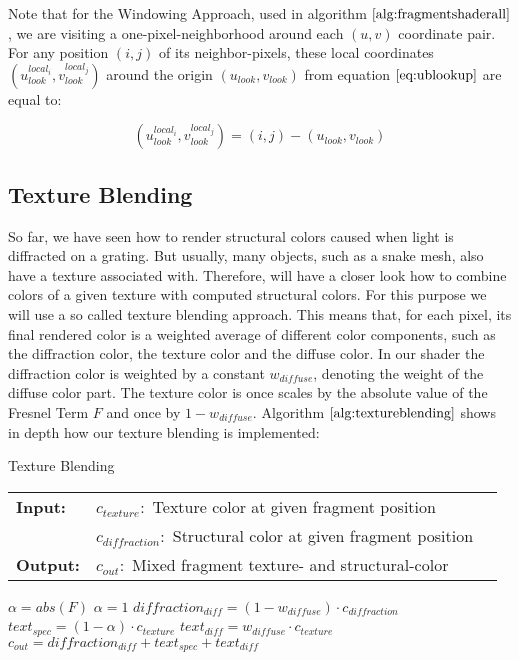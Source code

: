 Note that for the Windowing Approach, used in algorithm $\ref{alg:fragmentshaderall}$, we are visiting a one-pixel-neighborhood around each $(u,v)$ coordinate pair. For any position $(i,j)$ of its neighbor-pixels, these local coordinates $(u_{look}^{local_i}, v_{look}^{local_j})$ around the origin $(u_{look}, v_{look})$ from equation $\ref{eq:ublookup}$ are equal to:

\begin{equation}
  (u_{look}^{local_i}, v_{look}^{local_j}) = (i,j)-(u_{look}, v_{look})
\label{eq:gaussianwindowlook}
\end{equation}

\subsection{Texture Blending}
So far, we have seen how to render structural colors caused when light is diffracted on a grating. But usually, many objects, such as a snake mesh, also have a texture associated with. Therefore, will have a closer look how to combine colors of a given texture with computed structural colors. For this purpose we will use a so called texture blending approach. This means that, for each pixel, its final rendered color is a weighted average of different color components, such as the diffraction color, the texture color and the diffuse color. In our shader the diffraction color is weighted by a constant $w_{diffuse}$, denoting the weight of the diffuse color part. The texture color is once scales by the absolute value of the Fresnel Term $F$ and once by $1-w_{diffuse}$. Algorithm $\ref{alg:textureblending}$ shows in depth how our texture blending is implemented:

\begin{algorithm}[H]
\caption{Texture Blending}
\begin{table}[H]
  \begin{tabular}{@{}lll@{}}
    \textbf{Input:} & $c_{texture}:$ Texture color at given fragment position \\
    & $c_{diffraction}:$ Structural color at given fragment position \\
    \textbf{Output:} & $c_{out}:$ Mixed fragment texture- and structural-color \\
  \end{tabular} 
\end{table}
\setlength{\fboxrule}{0pt} 
\begin{boxedminipage}{1.0\textwidth}
  \begin{algorithmic}[1]
    \State $\alpha = abs(F)$
     \State $\alpha = 1$ \EndIf
    \State $diffraction_{diff} = (1-w_{diffuse}) \cdot c_{diffraction}$
    \State $text_{spec} = (1-\alpha) \cdot c_{texture}$
    \State $text_{diff} = w_{diffuse} \cdot c_{texture}$
    \State $c_{out} = diffraction_{diff} + text_{spec} + text_{diff}$
  \end{algorithmic}
  \end{boxedminipage}
  \vskip1.5pt
\label{alg:textureblending}
\end{algorithm}


